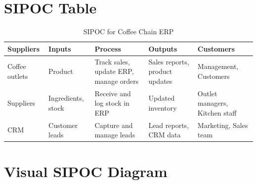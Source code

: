 \section*{SIPOC Table}

\begin{table}[H]
\centering
\begin{tabular}{|p{3cm}|p{3cm}|p{4cm}|p{3cm}|p{3cm}|}
\hline
\textbf{Suppliers} & \textbf{Inputs} & \textbf{Process} & \textbf{Outputs} & \textbf{Customers} \\
\hline
Coffee outlets & Product & Track sales, update ERP, manage orders & Sales reports, product updates & Management, Customers \\
\hline
Suppliers & Ingredients, stock & Receive and log stock in ERP & Updated inventory & Outlet managers, Kitchen staff \\
\hline
CRM & Customer leads & Capture and manage leads & Lead reports, CRM data & Marketing, Sales team \\
\hline
\end{tabular}
\caption{SIPOC for Coffee Chain ERP}
\end{table}

\section*{Visual SIPOC Diagram}

